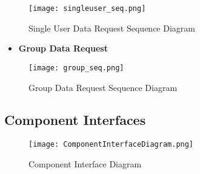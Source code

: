 \FloatBarrier
\begin{figure}[!h]
	\centering
	\texttt{[image: singleuser\_seq.png]}
	\caption{Single User Data Request Sequence Diagram}
\end{figure}
\FloatBarrier

\begin{itemize}
	\item \textbf{Group Data Request}
\end{itemize}

\FloatBarrier
\begin{figure}[!h]
	\centering
	\texttt{[image: group\_seq.png]}
	\caption{Group Data Request Sequence Diagram}
\end{figure}
\FloatBarrier


\subsection{Component Interfaces}

\FloatBarrier
\begin{figure}[!h]
	\centering
	\texttt{[image: ComponentInterfaceDiagram.png]}
	\caption{Component Interface Diagram}
\end{figure}
\FloatBarrier

